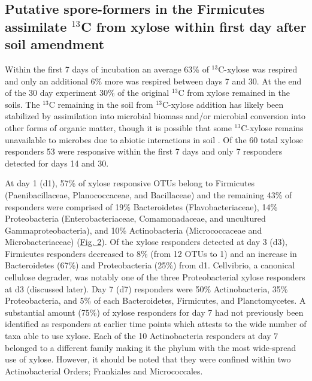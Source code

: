 \subsection{Putative spore-formers in the Firmicutes assimilate
$^{13}$C from xylose within first day after soil amendment} 
Within the first 7 days of incubation an average 63\% of
$^{13}$C-xylose was respired and only an additional 6\% more was
respired between days 7 and 30. At the end of the 30 day experiment 30\% of the original
$^{13}$C from xylose remained in the soils. The
$^{13}$C remaining in the soil from $^{13}$C-xylose
addition has likely been stabilized by assimilation into microbial biomass
and/or microbial conversion into other forms of organic matter, though it is
possible that some $^{13}$C-xylose remains unavailable to microbes
due to abiotic interactions in soil \citep{Kalbitz_2000}. Of the 60 total
xylose responders 53 were responsive within the first 7 days and only 7
responders detected for days 14 and 30. 

At day 1 (d1), 57\% of xylose responsive OTUs belong to Firmicutes
(Paenibacillaceae, Planococcaceae, and Bacillaceae) and the remaining 43\% of
responders were comprised of 19\% Bacteroidetes (Flavobacteriaceae), 14\%
Proteobacteria (Enterobacteriaceae, Comamonadaceae, and uncultured
Gammaproteobacteria), and 10\% Actinobacteria (Micrococcaceae and
Microbacteriaceae)
(\href{https://www.authorea.com/users/3537/articles/3612/master/file/figures/l2fc_fig1/l2fc_fig.pdf}{Fig.
2}). Of the xylose responders detected at day 3 (d3), Firmicutes responders
decreased to 8\% (from 12 OTUs to 1) and an increase in Bacteroidetes (67\%)
and Proteobacteria (25\%) from d1. Cellvibrio, a canonical cellulose degrader,
was notably one of the three Proteobacterial xylose responders at d3 (discussed
later). Day 7 (d7) responders were 50\% Actinobacteria, 35\% Proteobacteria,
and 5\% of each Bacteroidetes, Firmicutes, and Planctomycetes. A substantial
amount (75\%) of xylose responders for day 7 had not previously been identified
as responders at earlier time points which attests to the wide number of taxa
able to use xylose. Each of the 10 Actinobacteria responders at day 7 belonged
to a different family making it the phylum with the most wide-spread use of
xylose. However, it should be noted that they were confined within two
Actinobacterial Orders; Frankiales and Micrococcales. 

